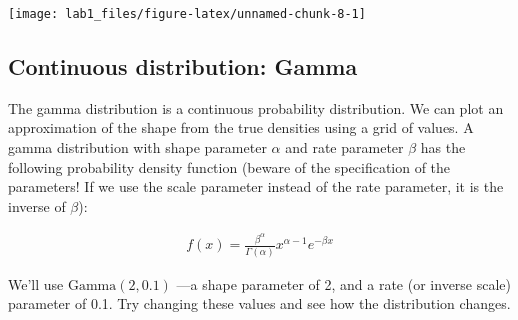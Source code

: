 \documentclass[]{article}
\newenvironment{Shaded}{\begin{snugshade}}{\end{snugshade}}
\newcommand{\KeywordTok}[1]{\textcolor[rgb]{0.13,0.29,0.53}{\textbf{#1}}}
\newcommand{\DataTypeTok}[1]{\textcolor[rgb]{0.13,0.29,0.53}{#1}}
\newcommand{\DecValTok}[1]{\textcolor[rgb]{0.00,0.00,0.81}{#1}}
\newcommand{\FloatTok}[1]{\textcolor[rgb]{0.00,0.00,0.81}{#1}}
\newcommand{\StringTok}[1]{\textcolor[rgb]{0.31,0.60,0.02}{#1}}
\newcommand{\CommentTok}[1]{\textcolor[rgb]{0.56,0.35,0.01}{\textit{#1}}}
\newcommand{\OperatorTok}[1]{\textcolor[rgb]{0.81,0.36,0.00}{\textbf{#1}}}
\newcommand{\NormalTok}[1]{#1}
\begin{document}
\begin{center}\texttt{[image: lab1\_files/figure-latex/unnamed-chunk-8-1]} \end{center}

\subsection{Continuous distribution:
Gamma}\label{continuous-distribution-gamma}

The gamma distribution is a continuous probability distribution. We can
plot an approximation of the shape from the true densities using a grid
of values. A gamma distribution with shape parameter \(\alpha\) and rate
parameter \(\beta\) has the following probability density function
(beware of the specification of the parameters! If we use the scale
parameter instead of the rate parameter, it is the inverse of
\(\beta\)):

\begin{align*}
f(x)=\frac{\beta^{\alpha}}{\Gamma(\alpha)} x^{\alpha-1} e^{-\beta x}
\end{align*}

We'll use \(\text{Gamma}(2,0.1)\) ---a shape parameter of 2, and a rate
(or inverse scale) parameter of 0.1. Try changing these values and see
how the distribution changes.

\begin{Shaded}
\end{Shaded}
\end{document}
